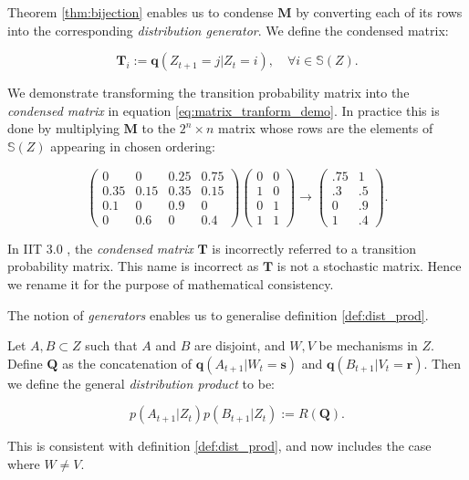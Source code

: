 Theorem \ref{thm:bijection} enables us to condense $\mathbf{M}$ by converting each of its rows into the corresponding \textit{distribution generator}. We define the condensed matrix:

\begin{equation}
\label{def:generators}
\mathbf{T}_{i} := \mathbf{q}(Z_{t+1} = j| Z_t = i) , \quad \forall i \in \mathbb{S}(Z).
\end{equation}

We demonstrate transforming the transition probability matrix into the \textit{condensed matrix} in equation \ref{eq:matrix_tranform_demo}. In practice this is done by multiplying $\mathbf{M}$ to the $2^n \times n$ matrix whose rows are the elements of $\mathbb{S}(Z)$ appearing in chosen ordering:



\begin{equation}
\label{eq:matrix_tranform_demo}
\left( \begin{array}{cccc} 0&0&0.25&0.75\\
							0.35&0.15&0.35&0.15\\
							0.1&0&0.9&0\\
							0&0.6&0&0.4
							\end{array} \right) 							
\left(\begin{array}{cc}0&0\\
1&0\\
0&1\\
1&1 \end{array} \right)
\rightarrow \left( \begin{array}{cc}.75&1\\
											.3&.5\\
											0&.9\\
											1&.4 \end{array} \right).
\end{equation}

\begin{remark}
	In IIT 3.0 \cite{oizumi2014phenomenology}, the \textit{condensed matrix} $\mathbf{T}$ is incorrectly referred to a transition probability matrix. This name is incorrect as $\mathbf{T}$ is not a stochastic matrix. Hence we rename it for the purpose of mathematical consistency.
\end{remark}

The notion of \textit{generators} enables us to generalise definition \ref{def:dist_prod}. 

\begin{definition}
	\label{def:dist_prod_gen}
	Let $A, B \subset Z$ such that $A$ and $B$ are disjoint, and $W,V$ be mechanisms in $Z$. Define $\mathbf{Q}$ as the concatenation of $\mathbf{q}(A_{t+1}|W_t = \mathbf{s})$ and 	$\mathbf{q}(B_{t+1}|V_t = \mathbf{r})$. Then we define the general \textit{distribution product} to be:
	
	\[p(A_{t+1}|Z_t)p(B_{t+1}|Z_t):=R(\mathbf{Q}).\]
	
	This is consistent with definition \ref{def:dist_prod}, and now includes the case where $W \neq V$.
\end{definition}

